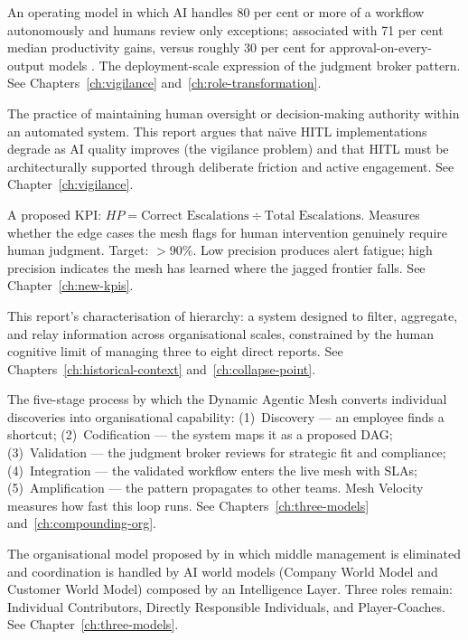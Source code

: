 \begin{description}[style=nextline, leftmargin=2em, font=\bfseries\color{navyblue}]
\item[Escalation Model]
An operating model in which AI handles 80 per cent or more of a workflow autonomously and humans review only exceptions; associated with 71 per cent median productivity gains, versus roughly 30 per cent for approval-on-every-output models \parencite{Pereira2026Playbook}. The deployment-scale expression of the judgment broker pattern. See Chapters~\ref{ch:vigilance} and~\ref{ch:role-transformation}.

\item[HITL (Human-in-the-Loop)]
The practice of maintaining human oversight or decision-making authority within an automated system. This report argues that na\"{\i}ve HITL implementations degrade as AI quality improves (the vigilance problem) and that HITL must be architecturally supported through deliberate friction and active engagement. See Chapter~\ref{ch:vigilance}.

\item[HITL Precision (HP)]
A proposed KPI: $HP = \text{Correct Escalations} \div \text{Total Escalations}$. Measures whether the edge cases the mesh flags for human intervention genuinely require human judgment. Target: $>90\%$. Low precision produces alert fatigue; high precision indicates the mesh has learned where the jagged frontier falls. See Chapter~\ref{ch:new-kpis}.

\item[Information Routing Protocol]
This report's characterisation of hierarchy: a system designed to filter, aggregate, and relay information across organisational scales, constrained by the human cognitive limit of managing three to eight direct reports. See Chapters~\ref{ch:historical-context} and~\ref{ch:collapse-point}.

\item[Insight Ingestion Loop]
The five-stage process by which the Dynamic Agentic Mesh converts individual discoveries into organisational capability: (1)~Discovery --- an employee finds a shortcut; (2)~Codification --- the system maps it as a proposed DAG; (3)~Validation --- the judgment broker reviews for strategic fit and compliance; (4)~Integration --- the validated workflow enters the live mesh with SLAs; (5)~Amplification --- the pattern propagates to other teams. Mesh Velocity measures how fast this loop runs. See Chapters~\ref{ch:three-models} and~\ref{ch:compounding-org}.

\item[Intelligence Layer]
The organisational model proposed by \textcite{DorseyBotha2026} in which middle management is eliminated and coordination is handled by AI world models (Company World Model and Customer World Model) composed by an Intelligence Layer. Three roles remain: Individual Contributors, Directly Responsible Individuals, and Player-Coaches. See Chapter~\ref{ch:three-models}.


\end{description}
